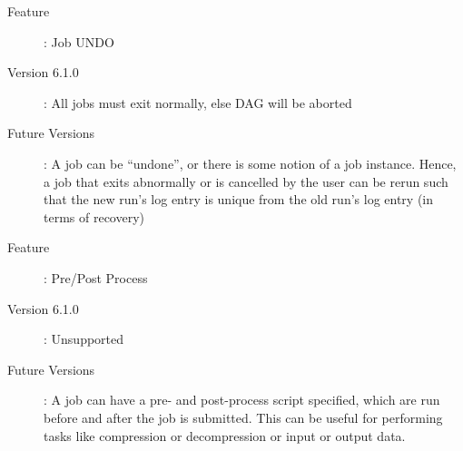 \begin{description}
\item[Feature]: Job UNDO
\item[Version 6.1.0]: All jobs must exit normally, else DAG will be aborted
\item[Future Versions]: A job can be ``undone'', or there is some
notion of a job instance.  Hence, a job that exits abnormally or is
cancelled by the user can be rerun such that the new run's log entry
is unique from the old run's log entry (in terms of recovery)
\end{description}

\begin{description}
\item[Feature]: Pre/Post Process
\item[Version 6.1.0]: Unsupported
\item[Future Versions]: A job can have a pre- and post-process script
specified, which are run before and after the job is submitted.  This can be
useful for performing tasks like compression or decompression or input or
output data.
\end{description}
